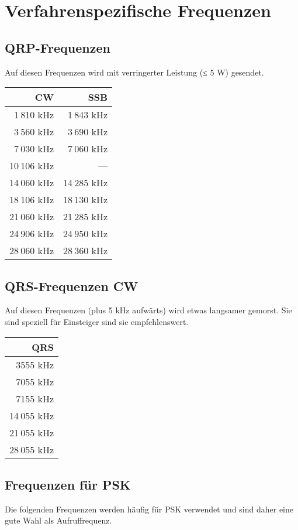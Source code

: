 \section{Verfahrenspezifische Frequenzen}
\subsection{QRP-Frequenzen}
Auf diesen Frequenzen wird mit verringerter Leistung (≤ 5 W) gesendet.

\vspace{1em}
\noindent
\begin{tabular}{r r}
\bfseries CW & \bfseries SSB \\ \toprule \arrayrulecolor{rowsep}
 1 810 kHz &  1 843 kHz \\ \midrule
 3 560 kHz &  3 690 kHz \\ \midrule
 7 030 kHz &  7 060 kHz \\ \midrule
10 106 kHz &          — \\ \midrule
14 060 kHz & 14 285 kHz \\ \midrule
18 106 kHz & 18 130 kHz \\ \midrule
21 060 kHz & 21 285 kHz \\ \midrule
24 906 kHz & 24 950 kHz \\ \midrule
28 060 kHz & 28 360 kHz \\ \midrule
\end{tabular}

\subsection{QRS-Frequenzen CW}
Auf diesen Frequenzen (plus 5 kHz aufwärts) wird etwas langsamer gemorst. Sie sind speziell für Einsteiger sind sie empfehlenswert.

\vspace{1em}
\noindent
\begin{tabular}{r}
  \textbf{QRS} \\ \toprule \arrayrulecolor{rowsep}
  3555 kHz \\ \midrule
  7055 kHz \\ \midrule
  7155 kHz \\ \midrule
14 055 kHz \\ \midrule
21 055 kHz \\ \midrule
28 055 kHz \\ \midrule
\end{tabular}

\subsection{Frequenzen für PSK}
Die folgenden Frequenzen werden häufig für PSK verwendet und sind daher eine gute Wahl als Aufruffrequenz.

